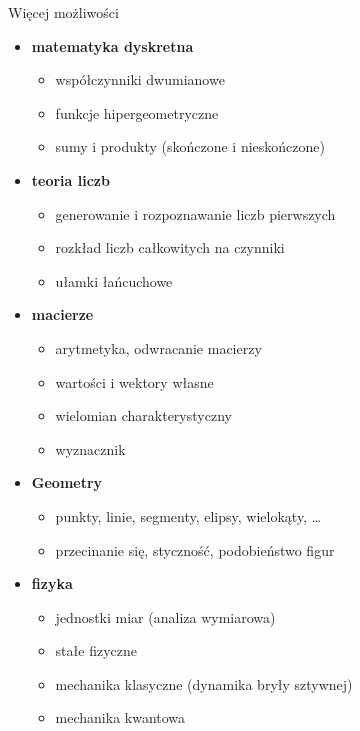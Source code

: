 \documentclass[10pt]{beamer}
\begin{document}
\begin{frame}{Więcej możliwości}
  \scriptsize
  \begin{multicols}{2}
    \begin{itemize}
      \item \textbf{matematyka dyskretna}
        \begin{itemize}
          \tiny
          \item współczynniki dwumianowe
          \item funkcje hipergeometryczne
          \item sumy i produkty (skończone i nieskończone)
      \end{itemize}
      \item \textbf{teoria liczb}
        \begin{itemize}
          \tiny
          \item generowanie i rozpoznawanie liczb pierwszych
          \item rozkład liczb całkowitych na czynniki
          \item ułamki łańcuchowe
        \end{itemize}
      \item \textbf{macierze}
        \begin{itemize}
          \tiny
          \item arytmetyka, odwracanie macierzy
          \item wartości i wektory własne
          \item wielomian charakterystyczny
          \item wyznacznik
        \end{itemize}
      \item \textbf{Geometry}
        \begin{itemize}
          \tiny
          \item punkty, linie, segmenty, elipsy, wielokąty, \ldots
          \item przecinanie się, styczność, podobieństwo figur
        \end{itemize}
      \item \textbf{fizyka}
        \begin{itemize}
          \tiny
          \item jednostki miar (analiza wymiarowa)
          \item stałe fizyczne
          \item mechanika klasyczne (dynamika bryły sztywnej)
          \item mechanika kwantowa

\end{itemize}
\end{itemize}
\end{multicols}
\end{frame}
\end{document}
